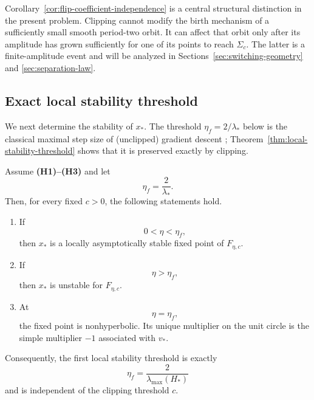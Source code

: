 \begin{remark}
\label{rem:local-versus-finite-amplitude}
Corollary~\ref{cor:flip-coefficient-independence} is a central
structural distinction in the present problem.  Clipping cannot
modify the birth mechanism of a sufficiently small smooth
period-two orbit.  It can affect that orbit only after its amplitude
has grown sufficiently for one of its points to reach $\Sigma_c$.
The latter is a finite-amplitude event and will be analyzed in
Sections~\ref{sec:switching-geometry} and
\ref{sec:separation-law}.
\end{remark}

\subsection{Exact local stability threshold}
\label{subsec:local-stability-threshold}

We next determine the stability of $x_*$.  The threshold
$\eta_f=2/\lambda_*$ below is the classical maximal step size of
(unclipped) gradient descent \cite{Polyak1987,Nesterov2018};
Theorem~\ref{thm:local-stability-threshold} shows that it is
preserved exactly by clipping.

\begin{theorem}
\label{thm:local-stability-threshold}
Assume \textbf{(H1)--(H3)} and let
\[
\eta_f=\frac{2}{\lambda_*}.
\]
Then, for every fixed $c>0$, the following statements hold.

\begin{enumerate}[label=\textnormal{(\roman*)}]

\item
If
\begin{equation}
0<\eta<\eta_f,
\label{eq:stable-eta-range}
\end{equation}
then $x_*$ is a locally asymptotically stable fixed point of
$F_{\eta,c}$.

\item
If
\begin{equation}
\eta>\eta_f,
\label{eq:unstable-eta-range}
\end{equation}
then $x_*$ is unstable for $F_{\eta,c}$.

\item
At
\begin{equation}
\eta=\eta_f,
\end{equation}
the fixed point is nonhyperbolic.  Its unique multiplier on the unit
circle is the simple multiplier $-1$ associated with $v_*$.

\end{enumerate}

Consequently, the first local stability threshold is exactly
\begin{equation}
\boxed{
\eta_f
=
\frac{2}{\lambda_{\max}(H_*)}
}
\label{eq:boxed-stability-threshold}
\end{equation}
and is independent of the clipping threshold $c$.
\end{theorem}

